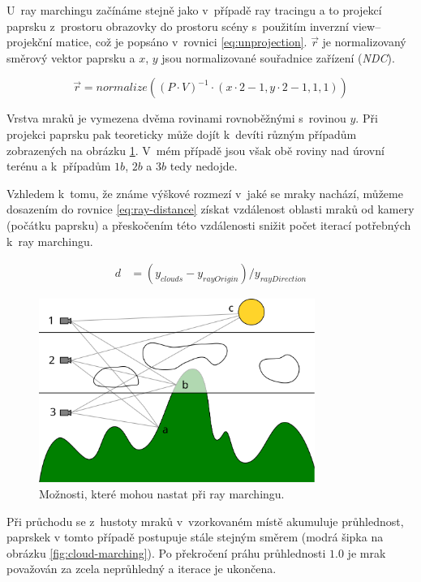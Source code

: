 \documentclass[a4paper, 12pt]{article}
\begin{document}
U~ray marchingu začínáme stejně jako v~případě ray tracingu a to projekcí
paprsku z~prostoru obrazovky do prostoru scény s~použitím inverzní
view--projekční matice, což je popsáno v~rovnici \ref{eq:unprojection}.
$\vec{r}$ je normalizovaný směrový vektor paprsku a $x$, $y$ jsou
normalizované souřadnice zařízení (\textit{NDC}).

\begin{equation}
  \vec{r} = normalize( (P \cdot V)^{-1} \cdot (x \cdot 2 - 1, y \cdot 2 - 1, 1, 1))
  \label{eq:unprojection}
\end{equation}

Vrstva mraků je vymezena dvěma rovinami rovnoběžnými s~rovinou $y$.
Při projekci paprsku pak teoreticky může dojít k~devíti různým případům
zobrazených na obrázku \ref{fig:camera-possibilities}.
V~mém případě jsou však obě roviny nad úrovní terénu a k~případům $1b$, $2b$ a $3b$
tedy nedojde.

Vzhledem k~tomu, že známe výškové rozmezí v~jaké se mraky nachází, můžeme
dosazením do rovnice \ref{eq:ray-distance} získat vzdálenost oblasti mraků
od kamery (počátku paprsku) a přeskočením této vzdálenosti snižit počet iterací
potřebných k~ray marchingu.

\begin{equation}
  \begin{aligned}
    d & = (y_{clouds} - y_{rayOrigin}) / y_{rayDirection}
  \end{aligned}
  \label{eq:ray-distance}
\end{equation}

\begin{figure}
  \centering
  \includegraphics[width=9cm,keepaspectratio]{img/camera-possibilities}
  \caption{Možnosti, které mohou nastat při ray marchingu.}
  \label{fig:camera-possibilities}
\end{figure}

Při průchodu se z~hustoty mraků v~vzorkovaném místě akumuluje průhlednost,
paprskek v tomto případě postupuje stále stejným směrem
(modrá šipka na obrázku \ref{fig:cloud-marching}).
Po překročení práhu průhlednosti $1.0$ je mrak považován za zcela neprůhledný
a iterace je ukončena.
\end{document}
